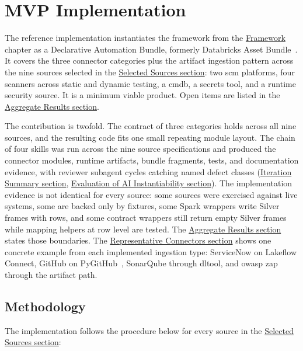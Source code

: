 \chapter{MVP Implementation}
\label{ch:implementation}

The reference implementation instantiates the framework from the \hyperref[ch:framework]{Framework} chapter as a Declarative Automation Bundle, formerly Databricks Asset Bundle~\parencite{DatabricksDAB2026}. It covers the three connector categories plus the artifact ingestion pattern across the nine sources selected in the \hyperref[sec:selected-sources]{Selected Sources section}: two \gls{scm} platforms, four scanners across static and dynamic testing, a \gls{cmdb}, a secrets tool, and a runtime security source. It is a minimum viable product. Open items are listed in the \hyperref[sec:impl-results]{Aggregate Results section}.

The contribution is twofold. The contract of three categories holds across all nine sources, and the resulting code fits one small repeating module layout. The chain of four skills was run across the nine source specifications and produced the connector modules, runtime artifacts, bundle fragments, tests, and documentation evidence, with reviewer subagent cycles catching named defect classes (\hyperref[sec:iteration-summary]{Iteration Summary section}, \hyperref[sec:ai-eval]{Evaluation of AI Instantiability section}). The implementation evidence is not identical for every source: some sources were exercised against live systems, some are backed only by fixtures, some Spark wrappers write Silver frames with rows, and some contract wrappers still return empty Silver frames while mapping helpers at row level are tested. The \hyperref[sec:impl-results]{Aggregate Results section} states those boundaries. The \hyperref[sec:impl-representative-connectors]{Representative Connectors section} shows one concrete example from each implemented ingestion type: ServiceNow on Lakeflow Connect, GitHub on PyGitHub~\parencite{PyGithubDocs2025}, SonarQube through \gls{dltool}, and \gls{owasp} \gls{zap} through the artifact path.

\section{Methodology}
\label{sec:impl-methodology}

The implementation follows the procedure below for every source in the \hyperref[sec:selected-sources]{Selected Sources section}:

